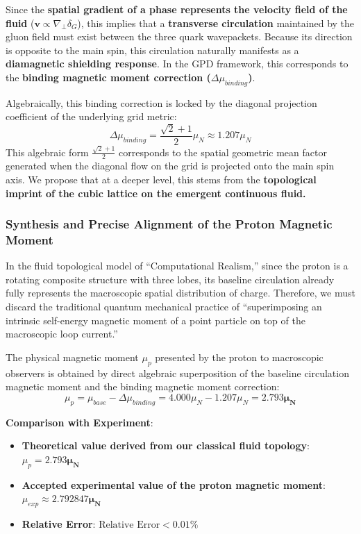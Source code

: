 \documentclass[12pt, a4paper]{article}
\begin{document}
Since the \textbf{spatial gradient of a phase represents the velocity field of the fluid} ($\mathbf{v} \propto \nabla_\perp \delta_G$), this implies that a \textbf{transverse circulation} maintained by the gluon field must exist between the three quark wavepackets. Because its direction is opposite to the main spin, this circulation naturally manifests as a \textbf{diamagnetic shielding response}. In the GPD framework, this corresponds to the \textbf{binding magnetic moment correction ($\Delta \mu_{binding}$)}.

Algebraically, this binding correction is locked by the diagonal projection coefficient of the underlying grid metric:
\begin{equation}
\Delta \mu_{binding} = \frac{\sqrt{2}+1}{2} \mu_N \approx 1.207 \mu_N \label{eq:binding_corr}
\end{equation}
This algebraic form $\frac{\sqrt{2}+1}{2}$ corresponds to the spatial geometric mean factor generated when the diagonal flow on the grid is projected onto the main spin axis. We propose that at a deeper level, this stems from the \textbf{topological imprint of the cubic lattice on the emergent continuous fluid.}

\subsubsection{Synthesis and Precise Alignment of the Proton Magnetic Moment}

In the fluid topological model of ``Computational Realism,'' since the proton is a rotating composite structure with three lobes, its baseline circulation already fully represents the macroscopic spatial distribution of charge. Therefore, we must discard the traditional quantum mechanical practice of ``superimposing an intrinsic self-energy magnetic moment of a point particle on top of the macroscopic loop current.''

The physical magnetic moment $\mu_p$ presented by the proton to macroscopic observers is obtained by direct algebraic superposition of the baseline circulation magnetic moment and the binding magnetic moment correction:
\begin{equation}
\mu_p = \mu_{base} - \Delta \mu_{binding} = 4.000 \mu_N - 1.207 \mu_N = \mathbf{2.793 \mu_N} \label{eq:mu_p_final}
\end{equation}

\textbf{Comparison with Experiment}:
\begin{itemize}
    \item \textbf{Theoretical value derived from our classical fluid topology}: $\mu_p = \mathbf{2.793 \mu_N}$
    \item \textbf{Accepted experimental value of the proton magnetic moment}: $\mu_{exp} \approx \mathbf{2.792847 \mu_N}$
    \item \textbf{Relative Error}: $\text{Relative Error} < \mathbf{0.01\%}$
\end{itemize}
\end{document}
